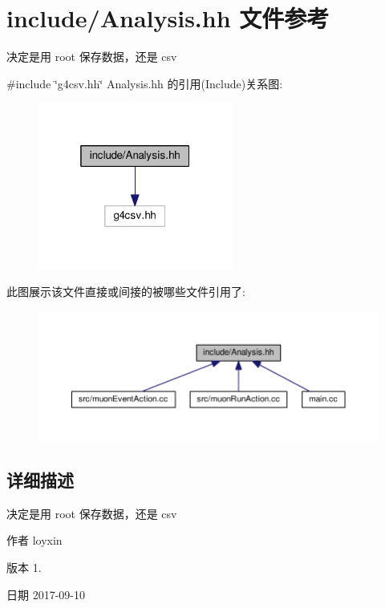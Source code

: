 \hypertarget{Analysis_8hh}{}\section{include/\+Analysis.hh 文件参考}
\label{Analysis_8hh}


决定是用 root 保存数据，还是 csv  


{\ttfamily \#include \char`\"{}g4csv.\+hh\char`\"{}}\newline
Analysis.\+hh 的引用(Include)关系图\+:\nopagebreak
\begin{figure}[H]
\begin{center}
\leavevmode
\includegraphics[width=181pt]{Analysis_8hh__incl}
\end{center}
\end{figure}
此图展示该文件直接或间接的被哪些文件引用了\+:\nopagebreak
\begin{figure}[H]
\begin{center}
\leavevmode
\includegraphics[width=350pt]{Analysis_8hh__dep__incl}
\end{center}
\end{figure}


\subsection{详细描述}
决定是用 root 保存数据，还是 csv 

\begin{DoxyAuthor}{作者}
loyxin 
\end{DoxyAuthor}
\begin{DoxyVersion}{版本}
1. 
\end{DoxyVersion}
\begin{DoxyDate}{日期}
2017-\/09-\/10 
\end{DoxyDate}
